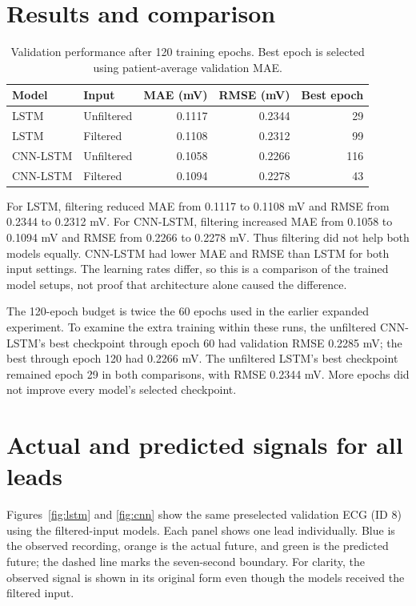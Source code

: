 \documentclass[11pt,a4paper]{article}
\begin{document}
\section{Results and comparison}
\begin{table}[H]\centering
\caption{Validation performance after 120 training epochs. Best epoch is selected using patient-average validation MAE.}
\begin{tabular}{llrrr}\toprule
Model & Input & MAE (mV) & RMSE (mV) & Best epoch \\\midrule
LSTM & Unfiltered & 0.1117 & 0.2344 & 29 \\
LSTM & Filtered & 0.1108 & 0.2312 & 99 \\
CNN-LSTM & Unfiltered & 0.1058 & 0.2266 & 116 \\
CNN-LSTM & Filtered & 0.1094 & 0.2278 & 43 \\\bottomrule
\end{tabular}
\end{table}
For LSTM, filtering reduced MAE from 0.1117 to 0.1108 mV and RMSE from 0.2344 to 0.2312 mV. For CNN-LSTM, filtering increased MAE from 0.1058 to 0.1094 mV and RMSE from 0.2266 to 0.2278 mV. Thus filtering did not help both models equally. CNN-LSTM had lower MAE and RMSE than LSTM for both input settings. The learning rates differ, so this is a comparison of the trained model setups, not proof that architecture alone caused the difference.

The 120-epoch budget is twice the 60 epochs used in the earlier expanded experiment. To examine the extra training within these runs, the unfiltered CNN-LSTM's best checkpoint through epoch 60 had validation RMSE 0.2285 mV; the best through epoch 120 had 0.2266 mV. The unfiltered LSTM's best checkpoint remained epoch 29 in both comparisons, with RMSE 0.2344 mV. More epochs did not improve every model's selected checkpoint.
\section{Actual and predicted signals for all leads}
Figures~\ref{fig:lstm} and \ref{fig:cnn} show the same preselected validation ECG (ID 8) using the filtered-input models. Each panel shows one lead individually. Blue is the observed recording, orange is the actual future, and green is the predicted future; the dashed line marks the seven-second boundary. For clarity, the observed signal is shown in its original form even though the models received the filtered input.
\end{document}
